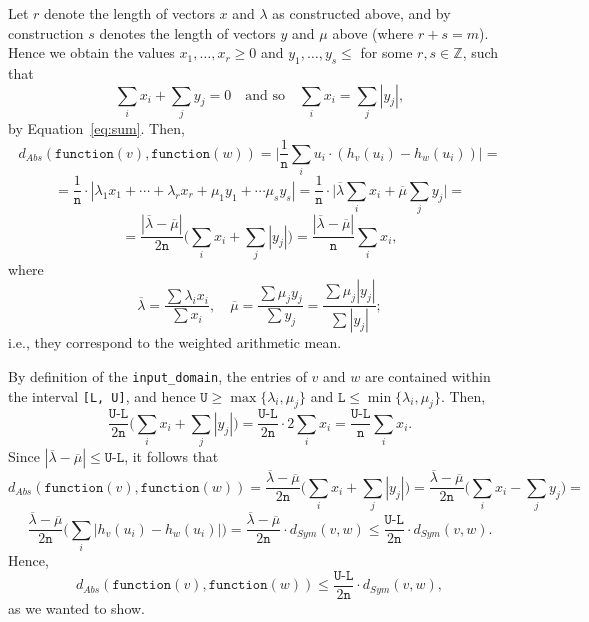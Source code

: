 \documentclass[11pt,a4paper]{article}
\theoremstyle{definition}
\newcommand{\MultiSet}{\mathrm{MultiSet}}
\newcommand{\function}{\texttt{function}}
\begin{document}
Let $r$ denote the length of vectors $x$ and $\lambda$ as constructed above, and by construction $s$ denotes the length of vectors $y$ and $\mu$ above (where $r+s = m$). Hence we obtain the values $x_1, \ldots, x_r \geq 0$ and $y_1, \ldots, y_s \leq$ for some $r, s \in \mathbb{Z}$, such that
\[
    \sum_i x_i + \sum_j y_j = 0 \quad \textrm{and so} \quad \sum_i x_i = \sum_j |y_j|,
\]
by Equation~\ref{eq:sum}. Then,
\[
    d_{Abs}(\function(v), \function(w)) = \Big|\dfrac{1}{\texttt{n}}\sum_i u_i \cdot (h_v(u_i) - h_w(u_i))\Big| =
\]
\[
    = \dfrac{1}{\texttt{n}} \cdot |\lambda_1 x_1 + \cdots + \lambda_r x_r + \mu_1 y_1 + \cdots \mu_s y_s| = \dfrac{1}{\texttt{n}} \cdot\Big|\overline{\lambda} \sum_i x_i + \overline{\mu} \sum_j y_j\Big| = 
\]
\[
    = \dfrac{|\overline{\lambda} - \overline{\mu}|}{2 \texttt{n}} \Big(\sum_i x_i + \sum_j |y_j|\Big) = \dfrac{|\overline{\lambda} - \overline{\mu}|}{\texttt{n}} \sum_i x_i,
\]  
where
\[
    \overline{\lambda} = \dfrac{\sum \lambda_i x_i}{\sum x_i}, \quad \overline{\mu} = \dfrac{\sum \mu_j y_j}{\sum y_j} = \dfrac{\sum \mu_j |y_j|}{\sum |y_j|};
\]
i.e., they correspond to the weighted arithmetic mean. 

By definition of the \texttt{input\_domain}, the entries of $v$ and $w$ are contained within the interval \texttt{[L, U]}, and hence $\texttt{U} \geq \max\{\lambda_i, \mu_j\}$ and $\texttt{L} \leq \min\{\lambda_i, \mu_j\}$. Then,
\[
    \dfrac{\texttt{U-L}}{2\texttt{n}} \Big(\sum_i x_i + \sum_j |y_j|\Big) = \dfrac{\texttt{U-L}}{2\texttt{n}} \cdot 2 \sum_i x_i = \dfrac{\texttt{U-L}}{\texttt{n}} \sum_i x_i.
\]
Since $|\overline{\lambda} - \overline{\mu}| \leq \texttt{U-L}$, it follows that
\[
    d_{Abs}(\function(v), \function(w)) = \dfrac{\overline{\lambda}-\overline{\mu}}{2\texttt{n}}\Big(\sum_i x_i + \sum_j |y_j|\Big) = \dfrac{\overline{\lambda}-\overline{\mu}}{2\texttt{n}}\Big(\sum_i x_i - \sum_j y_j\Big) =
\]
\[
    \dfrac{\overline{\lambda}-\overline{\mu}}{2\texttt{n}} \Big(\sum_i |h_v(u_i) - h_w(u_i)| \Big) = \dfrac{\overline{\lambda}-\overline{\mu}}{2\texttt{n}} \cdot d_{Sym}(v, w) \leq \dfrac{\texttt{U-L}}{2\texttt{n}} \cdot d_{Sym}(v, w).
\]
Hence,
\[
    d_{Abs}(\function(v), \function(w)) \leq \dfrac{\texttt{U-L}}{2\texttt{n}} \cdot d_{Sym}(v, w),
\]
as we wanted to show.
\end{document}
